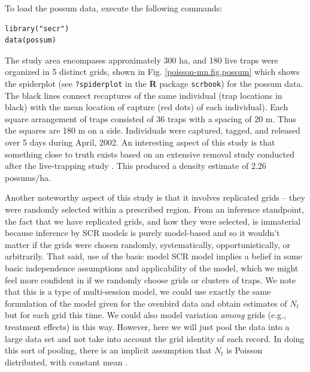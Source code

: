 To load the possum data, execute the following commands:
\begin{verbatim}
library("secr")
data(possum)
\end{verbatim}
The study area encompases approximately 300 ha, and 180 live traps
were
organized in 5 distinct grids, shown in  Fig. \ref{poisson-mn.fig.possum}
which shows the spiderplot (see \mbox{\tt ?spiderplot} in the {\bf R}
package \mbox{\tt scrbook}) for the possum data. The black lines
connect recaptures of the same individual (trap locations in black)
with the mean location of capture (red dots) of each individual).
Each square arrangement of traps consisted of
36 traps with a spacing of 20 m. Thus the squares are 180 m on a
side.
Individuals were captured, tagged, and released over 5 days during
April, 2002. An interesting aspect of this study is that something
close to truth exists based on an extensive removal study
conducted after the live-trapping study \citep{efford_etal:2005}. This
produced a density estimate of 2.26 possums/ha.  

Another noteworthy aspect of this study is that it involves replicated
grids -- they were randomly selected within a prescribed region.  From
an inference standpoint, the fact that we have replicated grids, and
how they were selected, is immaterial because inference by SCR models
is purely model-based and so it wouldn't matter if the grids were
chosen randomly, systematically, opportunistically, or
arbitrarily. That said, use of the basic model SCR model implies a
belief in some basic independence assumptions and applicability of the
model, which we might feel more confident in if we randomly choose
grids or clusters of traps.  We note that this is a type of
multi-session model, we could use exactly the same formulation of the
model given for the ovenbird data and obtain estimates of $N_{t}$ but
for each grid this time. We could also model variation {\it among}
grids (e.g., treatment effects) in this way. However, here we will
just pool the data into a large data set and not take into account the
grid identity of each record. In doing this sort of pooling, there is
an implicit assumption that $N_{t}$ is Poisson distributed, with
constant mean \citep{royle:2004abc, royle_etal:2011ms}.


